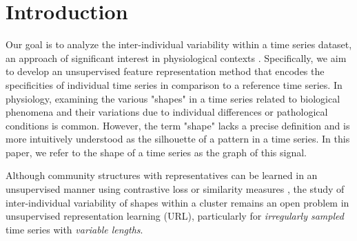 
\vspace{-1ex}
\section{Introduction}
\vspace{-1ex}



Our goal is to analyze the inter-individual variability within a time series dataset, an approach of significant interest in physiological contexts \cite{guscelli2019importance, wang2016research, bar2012studying, germain2023unsupervised}.
 Specifically, we aim to develop an unsupervised feature representation method that encodes the specificities of individual time series in comparison to a reference time series.
In physiology, examining the various "shapes" in a time series related to biological phenomena and their variations due to individual differences or pathological conditions is common.
 However, the term "shape" lacks a precise definition and is more intuitively understood as the silhouette of a pattern in a time series. In this paper, we refer to the shape of a time series as the graph of this signal.

 Although community structures with representatives can be learned in an unsupervised manner \cite{trirat2024universal, meng2023unsupervised} using contrastive loss \cite{franceschi2019unsupervised, tonekaboni2021unsupervised, meng2023unsupervised} or similarity measures \cite{asgari2023clustering, germain2023unsupervised, paparrizos2015k, ye2009time},
  the study of inter-individual variability of shapes within a cluster \cite{niennattrakul2007inaccuracies, shirato2023identifying} remains an open problem in unsupervised representation learning (URL), particularly for \textit{irregularly sampled} time series with \textit{variable lengths}.
   
